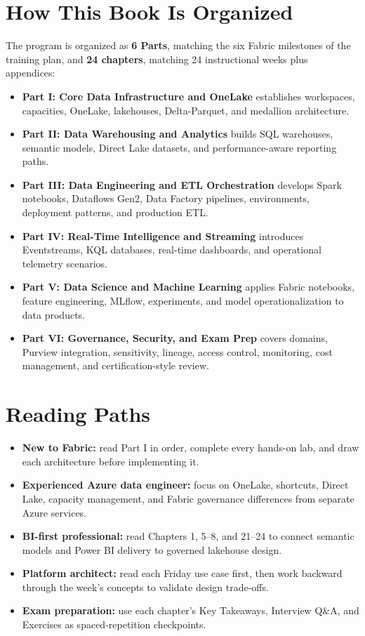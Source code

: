 \section*{How This Book Is Organized}
The program is organized as \textbf{6 Parts}, matching the six Fabric milestones of the training plan, and \textbf{24 chapters}, matching 24 instructional weeks plus appendices:
\begin{itemize}
    \item \textbf{Part I: Core Data Infrastructure and OneLake} establishes workspaces, capacities, OneLake, lakehouses, Delta-Parquet, and medallion architecture.
    \item \textbf{Part II: Data Warehousing and Analytics} builds SQL warehouses, semantic models, Direct Lake datasets, and performance-aware reporting paths.
    \item \textbf{Part III: Data Engineering and ETL Orchestration} develops Spark notebooks, Dataflows Gen2, Data Factory pipelines, environments, deployment patterns, and production ETL.
    \item \textbf{Part IV: Real-Time Intelligence and Streaming} introduces Eventstreams, KQL databases, real-time dashboards, and operational telemetry scenarios.
    \item \textbf{Part V: Data Science and Machine Learning} applies Fabric notebooks, feature engineering, MLflow, experiments, and model operationalization to data products.
    \item \textbf{Part VI: Governance, Security, and Exam Prep} covers domains, Purview integration, sensitivity, lineage, access control, monitoring, cost management, and certification-style review.
\end{itemize}

\section*{Reading Paths}
\begin{itemize}
    \item \textbf{New to Fabric:} read Part I in order, complete every hands-on lab, and draw each architecture before implementing it.
    \item \textbf{Experienced Azure data engineer:} focus on OneLake, shortcuts, Direct Lake, capacity management, and Fabric governance differences from separate Azure services.
    \item \textbf{BI-first professional:} read Chapters 1, 5--8, and 21--24 to connect semantic models and Power BI delivery to governed lakehouse design.
    \item \textbf{Platform architect:} read each Friday use case first, then work backward through the week's concepts to validate design trade-offs.
    \item \textbf{Exam preparation:} use each chapter's Key Takeaways, Interview Q\&A, and Exercises as spaced-repetition checkpoints.
\end{itemize}

